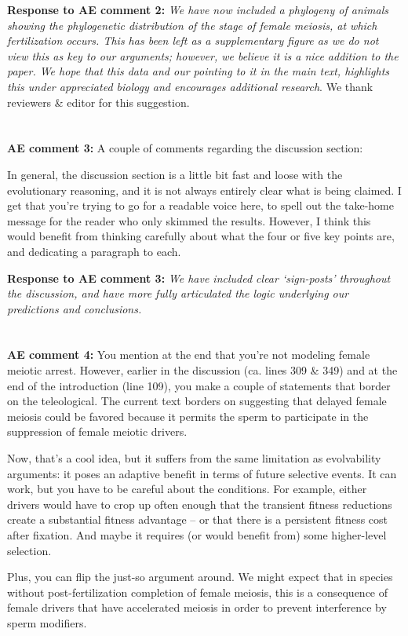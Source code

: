 \documentclass[12pt,letterpaper]{article}
\begin{document}
{\bf{Response to AE comment 2:}}  \emph{We have now included a phylogeny of animals showing the phylogenetic distribution of the stage of female meiosis, at which fertilization occurs. This has been left as a supplementary figure as we do not view this as key to our arguments; however, we believe it is a nice addition to the paper.  We hope that this data and our pointing to it in the main text, highlights this under appreciated biology and encourages additional research}. We thank reviewers \& editor for this suggestion. 
\\
\\
\\
{\bf{AE comment 3:}} 
A couple of comments regarding the discussion section:

In general, the discussion section is a little bit fast and loose with the evolutionary reasoning, and it is not always entirely clear what is being claimed. I get that you're trying to go for a readable voice here, to spell out the take-home message for the reader who only skimmed the results. However, I think this would benefit from thinking carefully about what the four or five key points are, and dedicating a paragraph to each.

{\bf{Response to AE comment 3:}}  \emph{We have included clear `sign-posts' throughout the discussion, and have more fully articulated the logic underlying our predictions and conclusions.}
\\
\\
\\
{\bf{AE comment 4:}} 
You mention at the end that you're not modeling female meiotic arrest. However, earlier in the discussion (ca. lines 309 \& 349) and at the end of the introduction (line 109), you make a couple of statements that border on the teleological. The current text borders on suggesting that delayed female meiosis could be favored because it permits the sperm to participate in the suppression of female meiotic drivers.

Now, that's a cool idea, but it suffers from the same limitation as evolvability arguments: it poses an adaptive benefit in terms of future selective events. It can work, but you have to be careful about the conditions. For example, either drivers would have to crop up often enough that the transient fitness reductions create a substantial fitness advantage -- or that there is a persistent fitness cost after fixation. And maybe it requires (or would benefit from) some higher-level selection.

Plus, you can flip the just-so argument around. We might expect that in species without post-fertilization completion of female meiosis, this is a consequence of female drivers that have accelerated meiosis in order to prevent interference by sperm modifiers.
\end{document}

